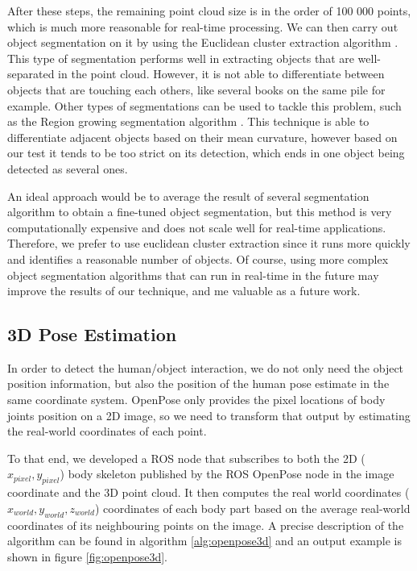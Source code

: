 After these steps, the remaining point cloud size is in the order of 100 000 points, which is much more reasonable for real-time processing. We can then carry out object segmentation on it by using the Euclidean cluster extraction algorithm \cite{euclidean_cluster_extraction}. This type of segmentation performs well in extracting objects that are well-separated in the point cloud. However, it is not able to differentiate between objects that are touching each others, like several books on the same pile for example. Other types of segmentations can be used to tackle this problem, such as the Region growing segmentation algorithm \cite{region_growing_seg}. This technique is able to differentiate adjacent objects based on their mean curvature, however based on our test it tends to be too strict on its detection, which ends in one object being detected as several ones. 

An ideal approach would be to average the result of several segmentation algorithm to obtain a fine-tuned object segmentation, but this method is very computationally expensive and does not scale well for real-time applications. Therefore, we prefer to use euclidean cluster extraction since it runs more quickly and identifies a reasonable number of objects. Of course, using more complex object segmentation algorithms that can run in real-time in the future may improve the results of our technique, and me valuable as a future work.

\subsection{3D Pose Estimation}
In order to detect the human/object interaction, we do not only need the object position information, but also the position of the human pose estimate in the same coordinate system. OpenPose only provides the pixel locations of body joints position on a 2D image, so we need to transform that output by estimating the real-world coordinates of each point.

To that end, we developed a ROS node that subscribes to both the 2D ($x_{pixel}, y_{pixel}$) body skeleton published by the ROS OpenPose node in the image coordinate and the 3D point cloud. It then computes the real world coordinates ($x_{world}, y_{world}, z_{world}$) coordinates of each body part based on the average real-world coordinates of its neighbouring points on the image. A precise description of the algorithm can be found in algorithm \ref{alg:openpose3d} and an output example is shown in figure \ref{fig:openpose3d}.

